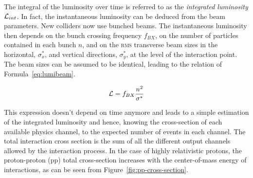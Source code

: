 	The integral of the luminosity over time is referred to as the \textit{integrated luminosity} $\mathcal{L}_{int}$. In fact, the instantaneous luminosity can be deduced from the beam parameters. New colliders now use bunched beams. The instantaneous luminosity then depends on the bunch crossing frequency $f_{BX}$, on the number of particles contained in each bunch $n$, and on the \textsc{rms} transverse beam sizes in the horizontal, $\sigma^*_x$, and vertical directions, $\sigma^*_y$, at the level of the interaction point. The beam sizes  can be assumed to be identical, leading to the relation of Formula~\ref{eq:lumibeam}.
	
	\begin{equation}
		\label{eq:lumibeam}
		\mathcal{L} = f_{BX}\frac{n^2}{\sigma^*}
	\end{equation}
	
	This expression doesn't depend on time anymore and leads to a simple estimation of the integrated luminosity and hence, knowing the cross-section of each available physics channel, to the expected number of events in each channel. The total interaction cross section is the sum of all the different output channels allowed by the interaction process. In the case of highly relativistic protons, the proton-proton (pp) total cross-section increases with the center-of-mass energy of interactions, as can be seen from Figure~\ref{fig:pp-cross-section}.
	
